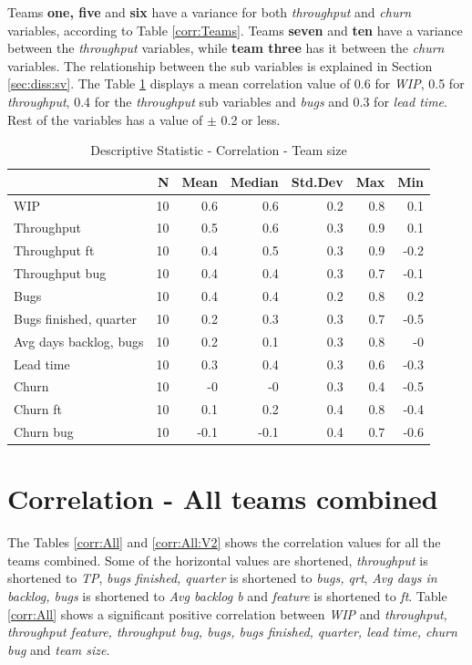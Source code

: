 \documentclass[UKenglish]{ifimaster}  %
\begin{document}
Teams \textbf{one, five} and \textbf{six} have a variance for both \textit{throughput} and \textit{churn} variables, according to Table \ref{corr:Teams}. Teams \textbf{seven} and \textbf{ten} have a variance between the \textit{throughput} variables, while \textbf{team three} has it between the \textit{churn} variables. The relationship between the sub variables is explained in Section \ref{sec:diss:sv}. The Table \ref{DS:corr:TS} displays a mean correlation value of 0.6 for  \textit{WIP}, 0.5 for \textit{throughput}, 0.4 for the \textit{throughput} sub variables and \textit{bugs} and 0.3 for \textit{lead time}. Rest of the variables has a value of $\pm$ 0.2 or less.

\begin{table}[!htbp]
 \centering
 \begin{tabular}{ | l | r | r | r | r | r | r | }
 \hline
& \bf{N} & \bf{Mean} & \bf{Median} & \bf{Std.Dev} & \bf{Max} & \bf{Min} \\ \hline
WIP  & 10 & 0.6 & 0.6 & 0.2 & 0.8 & 0.1\\ \hline
Throughput  & 10 & 0.5 & 0.6 & 0.3 & 0.9 & 0.1\\ \hline
Throughput ft  & 10 & 0.4 & 0.5 & 0.3 & 0.9 & -0.2\\ \hline
Throughput bug  & 10 & 0.4 & 0.4 & 0.3 & 0.7 & -0.1\\ \hline
Bugs  & 10 & 0.4 & 0.4 & 0.2 & 0.8 & 0.2\\ \hline
Bugs finished, quarter  & 10 & 0.2 & 0.3 & 0.3 & 0.7 & -0.5\\ \hline
Avg days backlog, bugs  & 10 & 0.2 & 0.1 & 0.3 & 0.8 & -0\\ \hline
Lead time & 10 & 0.3 & 0.4 & 0.3 & 0.6 & -0.3\\ \hline
Churn  & 10 & -0 & -0 & 0.3 & 0.4 & -0.5\\ \hline
Churn ft  & 10 & 0.1 & 0.2 & 0.4 & 0.8 & -0.4\\ \hline
Churn bug  & 10 & -0.1 & -0.1 & 0.4 & 0.7 & -0.6\\ \hline
\end{tabular}
 \caption{Descriptive Statistic - Correlation - Team size}
 \label{DS:corr:TS}
 \end{table}
  

\section{Correlation - All teams combined}
\label{sec:corr:alc}
The Tables \ref{corr:All} and \ref{corr:All:V2} shows the correlation values for all the teams combined. Some of the horizontal values are shortened, \textit{throughput} is shortened to \textit{TP}, \textit{bugs finished, quarter} is shortened to \textit{bugs, qrt},  \textit{Avg days in backlog, bugs} is shortened to \textit{Avg backlog b} and \textit{feature} is shortened to \textit{ft}. Table \ref{corr:All} shows a significant positive correlation between \textit{WIP} and \textit{throughput, throughput feature, throughput bug, bugs, bugs finished, quarter, lead time, churn bug} and \textit{team size}.
\end{document}

